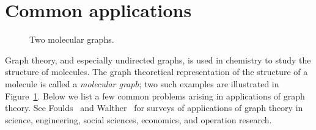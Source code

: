 \section{Common applications}
\label{sec:introduction:common_applications}

\begin{figure}[!htbp]
\centering

\caption{Two molecular graphs.}
\label{fig:introduction:molecular_graphs}
\end{figure}

\noindent
Graph theory, and especially undirected graphs, is used in chemistry
to study the structure of molecules. The graph theoretical
representation of the structure of a molecule is called a
\emph{molecular graph}; two such examples are illustrated in
Figure~\ref{fig:introduction:molecular_graphs}. Below we list a few
common problems arising in applications of graph theory. See
Foulds~\cite{Foulds1992} and Walther~\cite{Walther1984} for surveys of
applications of graph theory in science, engineering, social sciences,
economics, and operation research.

